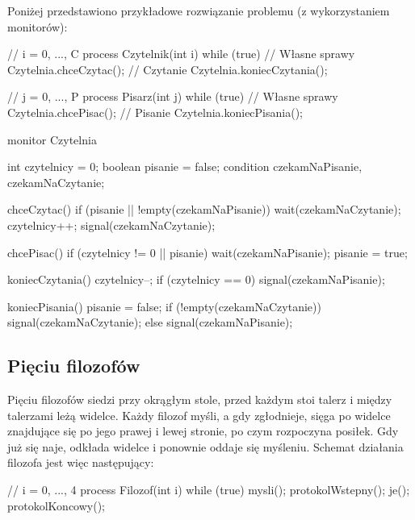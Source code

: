 Poniżej przedstawiono przykładowe rozwiązanie problemu (z wykorzystaniem monitorów):
\begin{java}
    // i = 0, ..., C
    process Czytelnik(int i) {
        while (true) {
            // Własne sprawy
            Czytelnia.chceCzytac();
            // Czytanie
            Czytelnia.koniecCzytania();
        }
    }

    // j = 0, ..., P
    process Pisarz(int j) {
        while (true) {
            // Własne sprawy
            Czytelnia.chcePisac();
            // Pisanie
            Czytelnia.koniecPisania();
        }
    }

    monitor Czytelnia {
        int czytelnicy = 0;
        boolean pisanie = false;
        condition czekamNaPisanie, czekamNaCzytanie;

        chceCzytac() {
            if (pisanie || !empty(czekamNaPisanie))
                wait(czekamNaCzytanie);
            czytelnicy++;
            signal(czekamNaCzytanie);
        }

        chcePisac() {
            if (czytelnicy != 0 || pisanie)
                wait(czekamNaPisanie);
            pisanie = true;
        }

        koniecCzytania() {
            czytelnicy--;
            if (czytelnicy == 0)
                signal(czekamNaPisanie);
        }

        koniecPisania() {
            pisanie = false;
            if (!empty(czekamNaCzytanie))
                signal(czekamNaCzytanie);
            else
                signal(czekamNaPisanie);
        }
    }
\end{java}

\subsection{Pięciu filozofów}

Pięciu filozofów siedzi przy okrągłym stole, przed każdym stoi talerz i między talerzami leżą widelce. Każdy filozof myśli, a gdy zgłodnieje, sięga po widelce znajdujące się po jego prawej i lewej stronie, po czym rozpoczyna posiłek. Gdy już się naje, odkłada widelce i ponownie oddaje się myśleniu. Schemat działania filozofa jest więc następujący:
\begin{java}
    // i = 0, ..., 4
    process Filozof(int i) {
        while (true) {
            mysli();
            protokolWstepny();
            je();
            protokolKoncowy();
        }
    }
\end{java}

